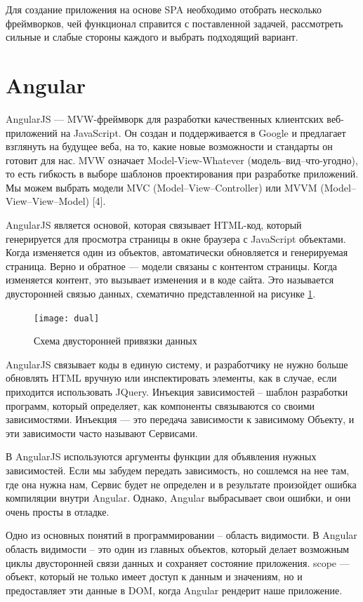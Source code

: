 Для создание приложения на основе SPA необходимо отобрать несколько фреймворков, чей функционал справится с поставленной задачей, рассмотреть сильные и слабые стороны каждого и выбрать подходящий вариант.

\section {Angular}

AngularJS --- MVW-фреймворк для разработки качественных клиентских веб-приложений на JavaScript. Он создан и поддерживается в Google и предлагает взглянуть на будущее веба, на то, какие новые возможности и стандарты он готовит для нас. MVW означает Model-View-Whatever (модель--вид--что-угодно), то есть гибкость в выборе шаблонов проектирования при разработке приложений. Мы можем выбрать модели MVC (Model--View--Controller) или MVVM (Model--View--View--Model) [4].

AngularJS является основой, которая связывает HTML-код, который генерируется для просмотра страницы в окне браузера с JavaScript объектами. Когда изменяется один из объектов, автоматически обновляется и генерируемая страница. Верно и обратное --- модели связаны с контентом страницы. Когда изменяется контент, это вызывает изменения и в коде сайта. Это называется двусторонней связью данных, схематично представленной на рисунке \ref{dual}.

\begin{figure}[ht]
\center\texttt{[image: dual]}
\caption{Схема двусторонней привязки данных}\label{dual}
\end{figure}

AngularJS связывает коды в единую систему, и разработчику не нужно больше обновлять HTML вручную или инспектировать элементы, как в случае, если приходится использовать JQuery.
Инъекция зависимостей – шаблон разработки программ, который определяет, как компоненты связываются со своими зависимостями. Инъекция — это передача зависимости к зависимому Объекту, и эти зависимости часто называют Сервисами.

В AngularJS используются аргументы функции для объявления нужных зависимостей. Если мы забудем передать зависимость, но сошлемся на нее там, где она нужна нам, Сервис будет не определен и в результате произойдет ошибка компиляции внутри Angular. Однако, Angular выбрасывает свои ошибки, и они очень просты в отладке.

Одно из основных понятий в программировании – область видимости. В Angular область видимости – это один из главных объектов, который делает возможным циклы двусторонней связи данных и сохраняет состояние приложения. \textdollar scope --- объект, который не только имеет доступ к данным и значениям, но и предоставляет эти данные в DOM, когда Angular рендерит наше приложение.

